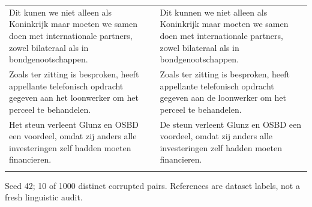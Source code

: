\documentclass[10pt]{article}
\begin{document}
{\begin{tabular}{@{}>{\raggedright\arraybackslash}p{}@{\hspace{0.04\textwidth}}>{\raggedright\arraybackslash}p{}@{}}
Dit kunen we niet alleen als Koninkrijk maar moeten we samen doen met internationale partners, zowel bilateraal als in bondgenootschappen. & Dit kunnen we niet alleen als Koninkrijk maar moeten we samen doen met internationale partners, zowel bilateraal als in bondgenootschappen. \\ \addlinespace[5pt]
Zoals ter zitting is besproken, heeft appellante telefonisch opdracht gegeven aan het loonwerker om het perceel te behandelen. & Zoals ter zitting is besproken, heeft appellante telefonisch opdracht gegeven aan de loonwerker om het perceel te behandelen. \\ \addlinespace[5pt]
Het steun verleent Glunz en OSBD een voordeel, omdat zij anders alle investeringen zelf hadden moeten financieren. & De steun verleent Glunz en OSBD een voordeel, omdat zij anders alle investeringen zelf hadden moeten financieren. \\ \addlinespace[5pt]
\bottomrule\end{tabular}}%
\ifdim\dimexpr\ht\pairtable+\dp\pairtable\relax>0.82\textheight%
\resizebox*{!}{0.82\textheight}{\usebox{\pairtable}}%
\else\usebox{\pairtable}\fi%
\par\smallskip\footnotesize Seed 42; 10 of 1000 distinct corrupted pairs. References are dataset labels, not a fresh linguistic audit.\normalsize
\clearpage
\end{document}
